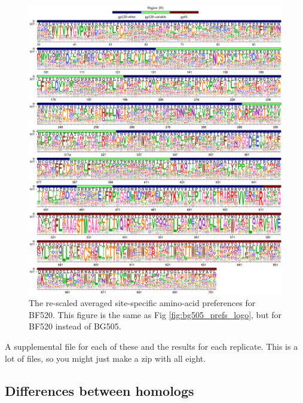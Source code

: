\documentclass[9pt,lineno]{elife}
\begin{document}
\begin{figure}
\centerline{\includegraphics[width=6.5in]{figures/prefs_BF520/prefs_BF520.png}}
\caption{\label{fig:bf520_prefs_logo}
The re-scaled averaged site-specific amino-acid preferences for BF520.
This figure is the same as Fig \ref{fig:bg505_prefs_logo}, but for BF520 instead of BG505.
}
\end{figure}

A supplemental file for each of these and the results for each replicate. This is a lot of files, so you might just make a zip with all eight.

\subsection*{Differences between homologs}
\end{document}
